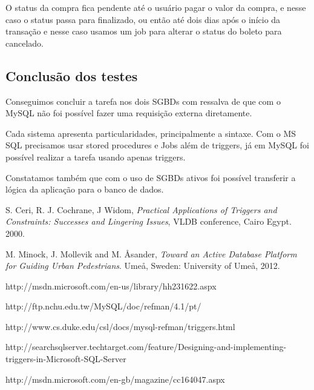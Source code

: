 \documentclass[conference]{IEEEtran}
\begin{document}
    O status da compra fica pendente até o usuário pagar o valor da compra, e nesse caso o status passa para finalizado, ou então até dois dias após o início da transação e nesse caso usamos um job para alterar o status do boleto para cancelado.

  \subsection{Conclusão dos testes}
    Conseguimos concluir a tarefa nos dois SGBDs com ressalva de que com o MySQL não foi possível fazer uma requisição externa diretamente.

	Cada sistema apresenta particularidades, principalmente a sintaxe. Com o MS SQL precisamos usar stored procedures e Jobs além de triggers, já em MySQL foi possível realizar a tarefa usando apenas triggers.

	Constatamos também que com o uso de SGBDs ativos foi possível transferir a lógica da aplicação para o banco de dados.


\begin{thebibliography}{1}

  S. Ceri, R. J. Cochrane, J Widom, \textit{Practical Applications of Triggers and Constraints: Successes and Lingering Issues}, VLDB conference, Cairo Egypt. 2000.

  M. Minock, J. Mollevik and M. \r{A}sander, \textit{Toward an Active Database Platform for Guiding Urban Pedestrians}. Ume\r{a}, Sweden: University of Ume\r{a}, 2012.

http://msdn.microsoft.com/en-us/library/hh231622.aspx

  http://ftp.nchu.edu.tw/MySQL/doc/refman/4.1/pt/

  http://www.cs.duke.edu/csl/docs/mysql-refman/triggers.html

http://searchsqlserver.techtarget.com/feature/Designing-and-implementing-triggers-in-Microsoft-SQL-Server

http://msdn.microsoft.com/en-gb/magazine/cc164047.aspx


\end{thebibliography}
\end{document}
